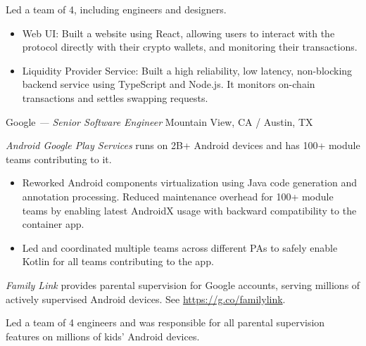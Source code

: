 \documentclass[]{friggeri-cv}
\begin{document}
\begin{entrylist}
{    Led a team of 4, including engineers and designers.

    \begin{itemize}
      \item Web UI:
      Built a website using React, allowing users to interact with the protocol directly with their crypto wallets,
      and monitoring their transactions.
      \item Liquidity Provider Service:
      Built a high reliability, low latency, non-blocking backend service using TypeScript and Node.js.
      It monitors on-chain transactions and settles swapping requests.
    \end{itemize}
  }
\end{entrylist}
\begin{entrylist}
  {Google \emph{--- Senior Software Engineer}}
  {Mountain View, CA / Austin, TX}
  {
    \emph{Android Google Play Services} runs on 2B+ Android devices and has 100+ module teams contributing to it.

    \begin{itemize}
      \item Reworked Android components virtualization using Java code generation and annotation processing.
      Reduced maintenance overhead for 100+ module teams by enabling
      latest AndroidX usage with backward compatibility to the container app.
      \item Led and coordinated multiple teams across different PAs to
      safely enable Kotlin for all teams contributing to the app.
    \end{itemize}

    \emph{Family Link} provides parental supervision for Google accounts,
    serving millions of actively supervised Android devices.
    See \url{https://g.co/familylink}.

    Led a team of 4 engineers and was responsible for all parental supervision features on millions of kids' Android devices.

}
\end{entrylist}
\end{document}
